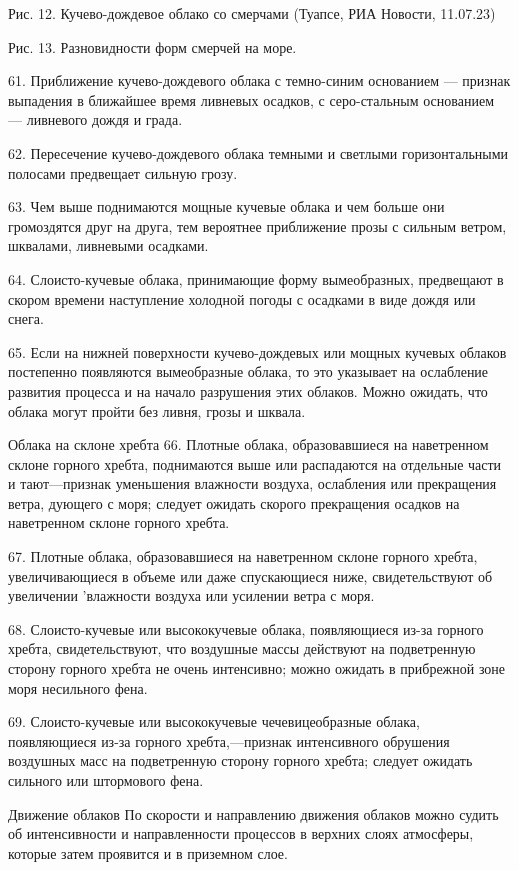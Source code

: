 Рис. 12. Кучево-дождевое облако со смерчами (Туапсе, РИА Новости, 11.07.23)


Рис. 13. Разновидности форм смерчей на море.

61. Приближение кучево-дождевого облака с темно-синим основанием — признак выпадения в ближайшее время ливневых осадков, с серо-стальным основанием — ливневого дождя и града.

62. Пересечение кучево-дождевого облака темными и светлыми горизонтальными полосами предвещает сильную грозу.

63. Чем выше поднимаются мощные кучевые облака и чем больше они громоздятся друг на друга, тем вероятнее приближение прозы с сильным ветром, шквалами, ливневыми осадками.

64. Слоисто-кучевые облака, принимающие форму вымеобразных, предвещают в скором времени наступление холодной погоды с осадками в виде дождя или снега.

65. Если на нижней поверхности кучево-дождевых или мощных кучевых облаков постепенно появляются вымеобразные облака, то это указывает на ослабление развития процесса и на начало разрушения этих облаков. Можно ожидать, что облака могут пройти без ливня, грозы и шквала.

Облака на склоне хребта
66. Плотные облака, образовавшиеся на наветренном склоне горного хребта, поднимаются выше или распадаются на отдельные части и тают—признак уменьшения влажности воздуха, ослабления или прекращения ветра, дующего с моря; следует ожидать скорого прекращения осадков на наветренном склоне горного хребта.

67. Плотные облака, образовавшиеся на наветренном склоне горного хребта, увеличивающиеся в объеме или даже спускающиеся ниже, свидетельствуют об увеличении 'влажности воздуха или усилении ветра с моря.

68. Слоисто-кучевые или высококучевые облака, появляющиеся из-за горного хребта, свидетельствуют, что воздушные массы действуют на подветренную сторону горного хребта не очень интенсивно; можно ожидать в прибрежной зоне моря несильного фена.

69. Слоисто-кучевые или высококучевые чечевицеобразные облака, появляющиеся из-за горного хребта,—признак интенсивного обрушения воздушных масс на подветренную сторону горного хребта; следует ожидать сильного или штормового фена.

Движение облаков
По скорости и направлению движения облаков можно судить об интенсивности и направленности процессов в верхних слоях атмосферы, которые затем проявится и в приземном слое.


